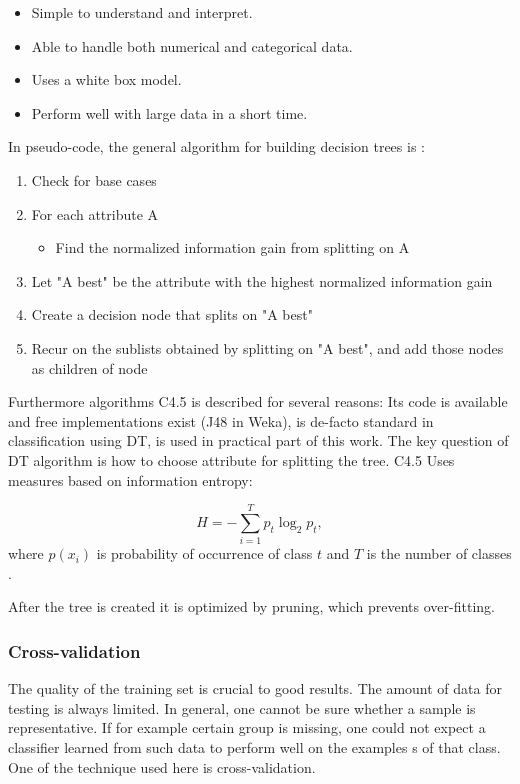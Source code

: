 \begin{itemize}
\item Simple to understand and interpret.
\item Able to handle both numerical and categorical data.
\item Uses a white box model.
\item Perform well with large data in a short time.
\end{itemize}

\noindent In pseudo-code, the general algorithm for building decision
trees is \citep{kotsiantis2007supervised}:
\begin{enumerate}
\item Check for base cases
\item For each attribute A
  \begin{itemize}
  \item Find the normalized information gain from splitting on A
  \end{itemize}
\item Let "A best" be the attribute with the highest normalized information gain
\item Create a decision node that splits on "{A best}"
\item Recur on the sublists obtained by splitting on "{A best}",
  and add those nodes as children of node
\end{enumerate}

Furthermore algorithms C4.5 is described for several reasons: Its code
is available and free implementations exist (J48 in Weka), is de-facto
standard in classification using DT, is used in practical part of this
work. The key question of DT algorithm is how to choose attribute for
splitting the tree. C4.5 Uses measures based on information entropy:

\begin{equation}
  \label{eq:entropy}
  H = -\sum_{i=1}^T {p_t \log_2 p_t},
\end{equation}
where $p(x_i)$ is probability of occurrence of class $t$ and $T$ is
the number of classes \citep{berka2003dobyvani}.

After the tree is created it is optimized by pruning, which prevents
over-fitting.

\subsubsection{Cross-validation}
The quality of the training set is crucial to good results. The amount
of data for testing is always limited. In general, one cannot be sure
whether a sample is representative. If for example certain group is
missing, one could not expect a classifier learned from such data to
perform well on the examples s of that class. One of the technique used
here is cross-validation.

